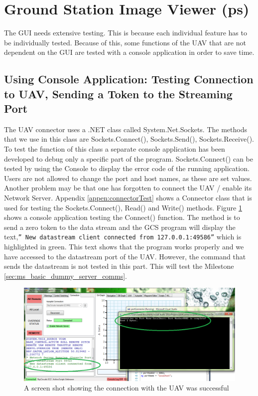 \section{Ground Station Image Viewer (ps)}
\label{sec:ground_station_image_viewer}

The GUI needs extensive testing. This is because each individual feature has to be individually tested. Because of this, some functions of the UAV that are not dependent on the GUI are tested with a console application in order to save time.
\subsection{Using Console Application: Testing Connection to UAV, Sending a Token to the Streaming Port}
\label{sec:testing_connection_send_to_stream}
The UAV connector uses a .NET class called System.Net.Sockets. The methods that we use in this class are Sockets.Connect(), Sockets.Send(), Sockets.Receive(). To test the function of this class a separate console application has been developed to debug only a specific part of the program. Sockets.Connect() can be tested by using the Console to display the error code of the running application. Users are not allowed to change the port and host names, as these are set values. Another problem may be that one has forgotten to connect the UAV / enable its Network Server. Appendix \ref{appen:connectorTest} shows a Connector class that is used for testing the Sockets.Connect(), Read() and Write() methods.
Figure \ref{connect to Stream Port} shows a console application testing the Connect() function. 
The method is to send a zero token to the data stream and the GCS program will display the text,\texttt{''\* New datastream client connected from 127.0.0.1:49586''} which is highlighted in green. 
This text shows that the program works properly and we have accessed to the datastream port of the UAV.
However, the command that sends the datastream is not tested in this part. 
This will test the Milestone \ref{sec:ms_basic_dummy_server_comms}.
\begin{figure}[H]
\begin{center}
\includegraphics[width=1.00\textwidth]{testing_screenshots/test_sending.png} 
\end{center}
\caption{A screen shot showing the connection with the UAV was successful\label{connect to Stream Port}}
\end{figure}

